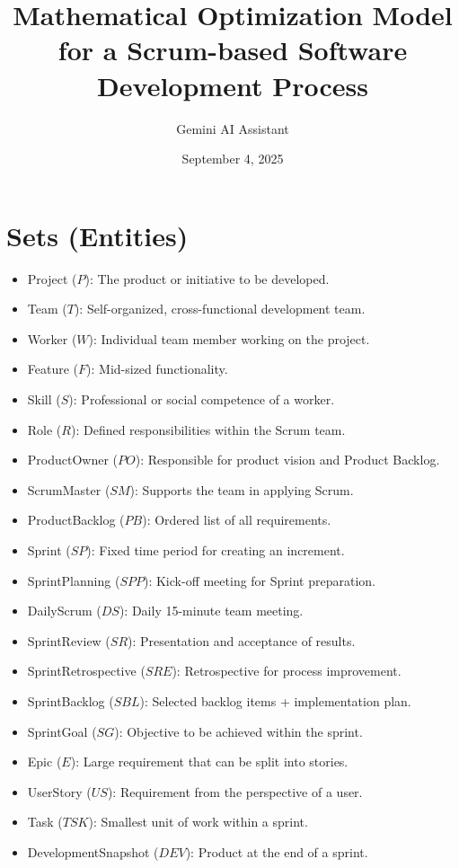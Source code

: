 \documentclass[11pt]{article}
\title{Mathematical Optimization Model for a Scrum-based Software Development Process}
\author{Gemini AI Assistant}
\date{September 4, 2025}
\begin{document}
\maketitle
\tableofcontents
\newpage

\section{Sets (Entities)}
\label{sec:sets}
\begin{itemize}
    \item Project ($P$): The product or initiative to be developed.
    \item Team ($T$): Self-organized, cross-functional development team.
    \item Worker ($W$): Individual team member working on the project.
    \item Feature ($F$): Mid-sized functionality.
    \item Skill ($S$): Professional or social competence of a worker.
    \item Role ($R$): Defined responsibilities within the Scrum team.
    \item ProductOwner ($PO$): Responsible for product vision and Product Backlog.
    \item ScrumMaster ($SM$): Supports the team in applying Scrum.
    \item ProductBacklog ($PB$): Ordered list of all requirements.
    \item Sprint ($SP$): Fixed time period for creating an increment.
    \item SprintPlanning ($SPP$): Kick-off meeting for Sprint preparation.
    \item DailyScrum ($DS$): Daily 15-minute team meeting.
    \item SprintReview ($SR$): Presentation and acceptance of results.
    \item SprintRetrospective ($SRE$): Retrospective for process improvement.
    \item SprintBacklog ($SBL$): Selected backlog items + implementation plan.
    \item SprintGoal ($SG$): Objective to be achieved within the sprint.
    \item Epic ($E$): Large requirement that can be split into stories.
    \item UserStory ($US$): Requirement from the perspective of a user.
    \item Task ($TSK$): Smallest unit of work within a sprint.
    \item DevelopmentSnapshot ($DEV$): Product at the end of a sprint.

\end{itemize}
\end{document}
